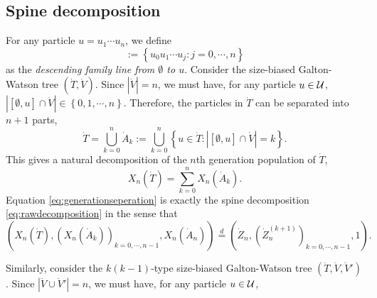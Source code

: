 \documentclass[12pt]{amsart}
\theoremstyle{remark}
\numberwithin{equation}{section}
\newcommand{\defn}[1]{{\em #1}}
\newcommand{\norm}[1]{\left\| #1 \right\|}
\newcommand{\expr}[1]{\left( #1 \right)}
\newcommand{\set}[1]{\left\{ #1 \right\}}
\newcommand{\ancestor}[1]{[\emptyset,#1]}
\newcommand{\eqlaw}{\overset{d}{=}}
\begin{document}
\subsection{Spine decomposition}
\label{sec:spinesdecomposition}
For any particle $u=u_1\cdots u_n$,  we define
\begin{equation*}
	    \ancestor{u}
	:=
	    \set{u_0u_1\cdots u_j:j=0,\cdots, n}
\end{equation*}
as the \defn{descending family line from $\emptyset$ to $u$}. 
Consider the size-biased Galton-Watson tree $(\dot T,\dot V)$. 
Since $|\dot V|=n$, we must have, for any particle $u\in\mathcal U$, 
$|\ancestor{u}\cap\dot V|\in\set{0,1,\cdots,n}$. 
Therefore, the particles in $\dot T$ can be separated into $n+1$ parts,
\begin{equation*}
		\dot T
	=
		\bigcup_{k=0}^n\dot A_k
	:=
	    \bigcup_{k=0}^n\set{u\in\dot T:|\ancestor{u}\cap \dot V|=k}.
\end{equation*}
This gives a natural decomposition of the $n$th generation population of $\dot T$,
\begin{equation}
\label{eq:generationseperation}
		X_n(\dot T)
	=
		\sum_{k=0}^nX_n(\dot A_k).
\end{equation}
Equation \eqref{eq:generationseperation} is exactly the spine decomposition \eqref{eq:rawdecomposition} in the sense that
\begin{equation*}
        \expr{X_n(\dot T),\expr{X_n(\dot A_k)}_{k=0,\cdots,n-1},X_n(\dot A_n)}
    \eqlaw
        \expr{\dot Z_n,\expr{\dot Z_n^{(k+1)}}_{k=0,\cdots,n-1},1}.
\end{equation*}
\par
Similarly, consider the $k(k-1)$-type size-biased 
Galton-Watson tree $(\ddot T,\ddot V,\ddot V')$. 
Since $|\ddot V\cup\ddot V'|=n$, we must have, 
for any particle $u\in\mathcal U$, 
\end{document}
